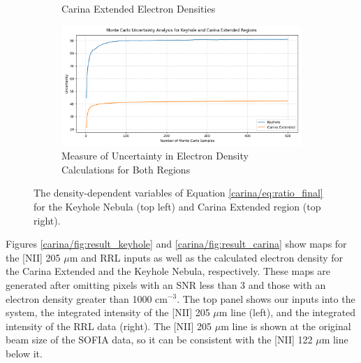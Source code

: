 \begin{figure}
\begin{subfigure}[t]{0.45\textwidth}
        \caption{Carina Extended Electron Densities}
        \label{carina/fig:calculations_carina}
    \end{subfigure}
    \begin{subfigure}[t]{\textwidth}
        \centering
        \includegraphics[width=\textwidth]{figs/carina/monte_carlo.png}
        \caption{Measure of Uncertainty in Electron Density Calculations for Both Regions}
        \label{carina/fig:monte_carlo}
    \end{subfigure}
    \caption[Density Dependent Variables for Electron Density Calculations and Monte Carlo Simulation]{
        The density-dependent variables of Equation \ref{carina/eq:ratio_final} for the Keyhole Nebula (top left) and Carina Extended region (top right).
        }
    \label{carina/fig:calculations}
\end{figure}

Figures \ref{carina/fig:result_keyhole} and \ref{carina/fig:result_carina} show maps for the [NII] 205 $\mu$m and RRL inputs as well as the calculated electron density for the Carina Extended and the Keyhole Nebula, respectively.
These maps are generated after omitting pixels with an SNR less than 3 and those with an electron density greater than 1000 cm$^{-3}$.
The top panel shows our inputs into the system, the integrated intensity of the [NII] 205 $\mu$m line (left), and the integrated intensity of the RRL data (right).
The [NII] 205 $\mu$m line is shown at the original beam size of the SOFIA data, so it can be consistent with the [NII] 122 $\mu$m line below it.

